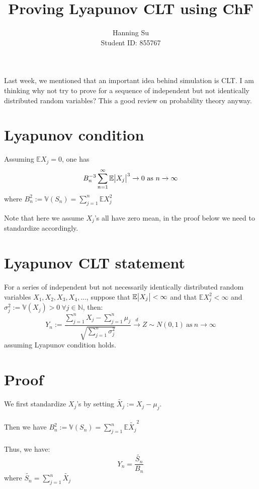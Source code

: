 \documentclass[]{article}
\begin{document}
\title{\textbf {Proving Lyapunov CLT using ChF}}
\author{
		Hanning Su \\
        Student ID: 855767\\
}
\maketitle

Last week, we mentioned that an important idea behind simulation is CLT. I am thinking why not try to prove for  a sequence of independent but not identically distributed random variables? This a good review on probability theory anyway.

\section*{Lyapunov condition}

Assuming $\mathbb{E} X_j = 0$, one has $$B^{-3}_n \sum_{n=1}^{\infty} \mathbb{E} \abs{X_j}^3 \xrightarrow[]{} 0 \ \text{as}\  n \xrightarrow[]{} \infty$$ where $B_n^2 := \mathbb{V}(S_n) = \sum_{j = 1}^{n} \mathbb{E} X_j^2$

Note that here we assume $X_j$'s all have zero mean, in the proof below we need to standardize accordingly.

\section*{Lyapunov CLT statement}

For a series of independent but not necessarily identically distributed random variables $X_1, X_2, X_3, X_4, ...$, suppose that  $\mathbb{E} \abs{X_j} < \infty $ and that $\mathbb{E} X_j^2 < \infty$ and $\sigma_j^2 := \mathbb{V}(X_j) > 0 \ \forall j \in \mathbb{N}$, then:
$$ Y_n := \frac{\sum_{j=1}^{n} X_j - \sum_{j=1}^{n} \mu_j}{\sqrt{\sum_{j=1}^{n} \sigma_j^2}} \xrightarrow[]{d} Z \sim N(0, 1) \ \text{as}\  n \xrightarrow[]{} \infty$$ assuming Lyapunov condition holds.

\section*{Proof}
We first standardize $X_j$'s by setting $\tilde{X_j} := X_j - \mu_j$. \\
\\
Then we have $B_n^2 := \mathbb{V}(S_n) = \sum_{j = 1}^{n} \mathbb{E} \tilde{X_j}^2$ \\
\\
Thus, we have: $$Y_n = \frac{\tilde{S_n}}{B_n} $$
where $\tilde{S_n} = \sum_{j = 1}^{n} \tilde{X_j}$
\end{document}
